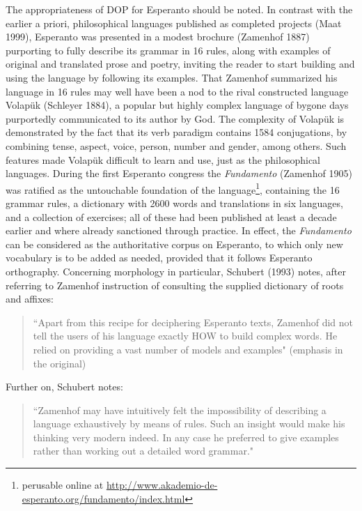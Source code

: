 \documentclass[10pt,a4paper]{article}
\begin{document}
The appropriateness of DOP for Esperanto should be noted. In contrast with the
earlier a priori, philosophical languages published as completed projects
(Maat 1999), Esperanto was presented in a modest brochure (Zamenhof 1887)
purporting to fully describe its grammar in 16 rules, along with examples of
original and translated prose and poetry, inviting the reader to start
building and using the language by following its examples. That Zamenhof
summarized his language in 16 rules may well have been a nod to the rival
constructed language Volap\"uk (Schleyer 1884), a popular but highly complex
language of bygone days purportedly communicated to its author by God.  The
complexity of Volap\"uk is demonstrated by the fact that its verb paradigm
contains 1584 conjugations, by combining tense, aspect, voice, person, number
and gender, among others. Such features made Volap\"uk difficult to learn and
use, just as the philosophical languages. During the first Esperanto congress
the {\em Fundamento} (Zamenhof 1905) was ratified as the untouchable foundation
of the language\footnote{perusable online at
\url{http://www.akademio-de-esperanto.org/fundamento/index.html}}, containing
the 16 grammar rules, a dictionary with 2600 words and translations in six
languages, and a collection of
exercises; all of these had been published at least a decade earlier and where
already sanctioned through practice. In effect, the {\em Fundamento} can be
considered as the authoritative corpus on Esperanto, to which only new
vocabulary is to be added as needed, provided that it follows Esperanto orthography.
Concerning morphology in particular, Schubert (1993) notes, after referring to
Zamenhof instruction of consulting the supplied dictionary of roots and
affixes:

\begin{quote}
	``Apart from this recipe for deciphering Esperanto texts,
	Zamenhof did not tell the users of his language exactly HOW to
	build complex words. He relied on providing a vast number of models and
	examples" (emphasis in the original)
\end{quote}

Further on, Schubert notes:

\begin{quote}
	``Zamenhof may have intuitively felt the impossibility of describing a
	language exhaustively by means of rules. Such an insight would make his
	thinking very modern indeed. In any case he preferred to give examples
	rather than working out a detailed word grammar."
\end{quote}
\end{document}
